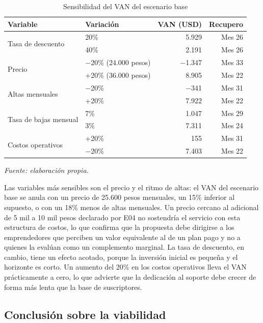 \begin{table}[!htbp]
\centering
\caption{Sensibilidad del VAN del escenario base}
\label{tab:viabilidad-sensibilidad}
\renewcommand{\arraystretch}{1.3}
\footnotesize
\setlength{\tabcolsep}{4pt}
\begin{tabular}{|m{3.6cm}|m{3.4cm}|r|r|}
\hline
\textbf{Variable} & \textbf{Variación} & \textbf{VAN (USD)} & \textbf{Recupero} \\
\hline
\multirow{2}{*}{Tasa de descuento} & 20\% & 5.929 & Mes 26 \\
\cline{2-4}
 & 40\% & 2.191 & Mes 26 \\
\hline
\multirow{2}{*}{Precio} & $-$20\% (24.000 pesos) & $-$1.347 & Mes 33 \\
\cline{2-4}
 & +20\% (36.000 pesos) & 8.905 & Mes 22 \\
\hline
\multirow{2}{*}{Altas mensuales} & $-$20\% & $-$341 & Mes 31 \\
\cline{2-4}
 & +20\% & 7.922 & Mes 22 \\
\hline
\multirow{2}{*}{Tasa de bajas mensual} & 7\% & 1.047 & Mes 29 \\
\cline{2-4}
 & 3\% & 7.311 & Mes 24 \\
\hline
\multirow{2}{*}{Costos operativos} & +20\% & 155 & Mes 31 \\
\cline{2-4}
 & $-$20\% & 7.403 & Mes 22 \\
\hline
\end{tabular}

\smallskip
\noindent\textit{Fuente: elaboración propia.}
\end{table}

Las variables más sensibles son el precio y el ritmo de altas: el VAN del escenario base se anula con un precio de 25.600 pesos mensuales, un 15\% inferior al supuesto, o con un 18\% menos de altas mensuales. Un precio cercano al adicional de 5 mil a 10 mil pesos declarado por E04 no sostendría el servicio con esta estructura de costos, lo que confirma que la propuesta debe dirigirse a los emprendedores que perciben un valor equivalente al de un plan pago y no a quienes la evalúan como un complemento marginal. La tasa de descuento, en cambio, tiene un efecto acotado, porque la inversión inicial es pequeña y el horizonte es corto. Un aumento del 20\% en los costos operativos lleva el VAN prácticamente a cero, lo que advierte que la dedicación al soporte debe crecer de forma más lenta que la base de suscriptores.

\subsection{Conclusión sobre la viabilidad}
\label{sec:viabilidad-conclusion}

